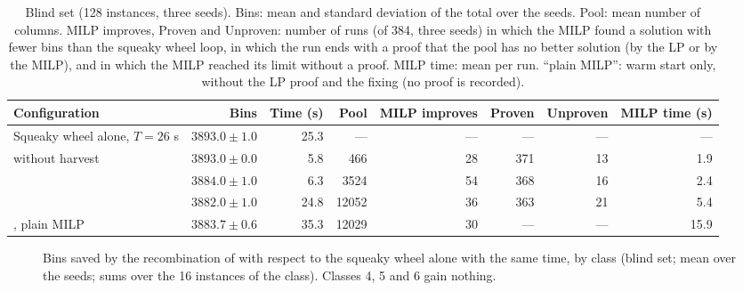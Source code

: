 \begin{table}[t]
\centering
\footnotesize\setlength{\tabcolsep}{3pt}
\caption{Blind set (128 instances, three seeds). Bins: mean and standard deviation of the total over the seeds. Pool: mean number of columns. MILP improves, Proven and Unproven: number of runs (of 384, three seeds)
in which the MILP found a solution with fewer bins than the squeaky wheel loop, in which the run ends with a proof that the pool has no better solution (by the LP or by the MILP), and in which the MILP reached its limit without a proof.
MILP time: mean per run. ``plain MILP'': warm start only, without the LP proof and the fixing (no proof is recorded).}
\label{tab:e-recomb}
\begin{tabular}{@{}lrrrrrrr@{}}
\toprule
Configuration & Bins & Time (s) & Pool & MILP improves & Proven & Unproven & MILP time (s)\\
\midrule
Squeaky wheel alone, $T=26$ s & $3893.0\pm 1.0$ & 25.3 & --- & --- & --- & --- & ---\\
\cfgfast{} without harvest & $3893.0\pm 0.0$ & 5.8 & 466 & 28 & 371 & 13 & 1.9\\
\cfgfast{} & $3884.0\pm 1.0$ & 6.3 & 3524 & 54 & 368 & 16 & 2.4\\
\cfgbal{} & $3882.0\pm 1.0$ & 24.8 & 12052 & 36 & 363 & 21 & 5.4\\
\cfgbal{}, plain MILP & $3883.7\pm 0.6$ & 35.3 & 12029 & 30 & --- & --- & 15.9\\
\bottomrule
\end{tabular}
\end{table}

\begin{figure}[t]
\centering
{}
\caption{Bins saved by the recombination of \cfgbal{} with respect to the squeaky wheel alone with the same time, by class (blind set; mean over the seeds; sums over the 16 instances of the class). Classes 4, 5 and 6 gain nothing.}
\label{fig:e-class}
\end{figure}

